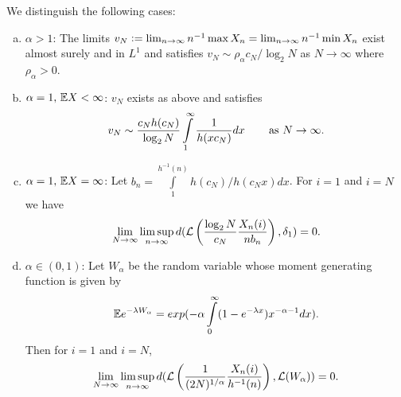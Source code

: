 \begin{theorem}\label{thm:poly_tails_result}
We distinguish the following cases:
\begin{enumerate}[(a)]

\item \vspace{-2mm} $\alpha > 1$: The limits $v_N \defeq \lim_{n \to \infty} n^{-1} \max X_n = \lim_{n \to \infty} n^{-1} \min X_n$ exist almost surely and in $L^1$ and satisfies $v_N \sim \rho_\alpha c_N / \log_2 N$ as $N \to \infty$ where $\rho_\alpha > 0$. \\

\item \vspace{-6mm} $\alpha = 1,\, \E X < \infty$: $v_N$ exists as above and satisfies 
\begin{equation}
v_N \sim \frac{c_N h(c_N)}{\log_2 N} \int\limits^\infty_1 \frac{1}{h(x c_N)} dx \qquad\,\text{as }N \to \infty. \\
\end{equation}

\item \vspace{-7mm} $\alpha = 1,\, \E X = \infty$: Let $b_n = \int\limits^{h^{-1}(n)}_{1} h(c_N)/h(c_N x) dx$. For $i=1$ and $i=N$ we have
\begin{equation}\nonumber
\lim\limits_{N \to \infty} \limsup\limits_{n \to \infty} d(\cal{L}\left( \frac{\log_2 N}{c_N}\frac{X_n(i)}{n b_n}\right), \delta_1) = 0. 
\end{equation}

\item \vspace{-5mm} $\alpha \in (0, 1)$: Let $W_\alpha$ be the random variable whose moment generating function is given by
\begin{equation}\nonumber
\E e^{-\lambda W_\alpha} = exp(- \alpha \int\limits^\infty_0 (1 - e^{-\lambda x})x^{-\alpha - 1}dx). 
\end{equation}
Then for $i=1$ and $i=N$, 
\begin{equation}\nonumber
\lim\limits_{N \to \infty} \limsup\limits_{n \to \infty} d(\cal{L}\left( \frac{1}{(2N)^{1/\alpha}}\frac{X_n(i)}{h^{-1}(n)}\right), \cal{L}(W_\alpha)) = 0. 
\end{equation}
\end{enumerate}
\end{theorem}

